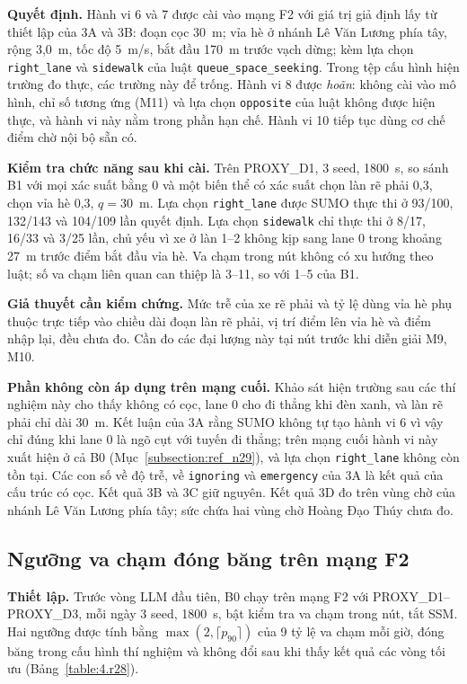 \documentclass[../DoAn.tex]{subfiles}
\begin{document}
\textbf{Quyết định.} Hành vi 6 và 7 được cài vào mạng F2 với giá trị giả định lấy từ thiết lập của 3A và 3B: đoạn cọc 30~m; vỉa hè ở nhánh Lê Văn Lương phía tây, rộng 3,0~m, tốc độ 5~m/s, bắt đầu 170~m trước vạch dừng; kèm lựa chọn \texttt{right\_lane} và \texttt{sidewalk} của luật \texttt{queue\_space\_seeking}. Trong tệp cấu hình hiện trường đo thực, các trường này để trống. Hành vi 8 được \emph{hoãn}: không cài vào mô hình, chỉ số tương ứng (M11) và lựa chọn \texttt{opposite} của luật không được hiện thực, và hành vi này nằm trong phần hạn chế. Hành vi 10 tiếp tục dùng cơ chế điểm chờ nội bộ sẵn có.

\textbf{Kiểm tra chức năng sau khi cài.} Trên PROXY\_D1, 3 seed, 1800~s, so sánh B1 với mọi xác suất bằng 0 và một biến thể có xác suất chọn làn rẽ phải 0,3, chọn vỉa hè 0,3, $q = 30$~m. Lựa chọn \texttt{right\_lane} được SUMO thực thi ở 93/100, 132/143 và 104/109 lần quyết định. Lựa chọn \texttt{sidewalk} chỉ thực thi ở 8/17, 16/33 và 3/25 lần, chủ yếu vì xe ở làn 1--2 không kịp sang lane 0 trong khoảng 27~m trước điểm bắt đầu vỉa hè. Va chạm trong nút không có xu hướng theo luật; số va chạm liên quan can thiệp là 3--11, so với 1--5 của B1.

\textbf{Giả thuyết cần kiểm chứng.} Mức trễ của xe rẽ phải và tỷ lệ dùng vỉa hè phụ thuộc trực tiếp vào chiều dài đoạn làn rẽ phải, vị trí điểm lên vỉa hè và điểm nhập lại, đều chưa đo. Cần đo các đại lượng này tại nút trước khi diễn giải M9, M10.

\textbf{Phần không còn áp dụng trên mạng cuối.} Khảo sát hiện trường sau các thí nghiệm này cho thấy không có cọc, lane 0 cho đi thẳng khi đèn xanh, và làn rẽ phải chỉ dài 30~m. Kết luận của 3A rằng SUMO không tự tạo hành vi 6 vì vậy chỉ đúng khi lane 0 là ngõ cụt với tuyến đi thẳng; trên mạng cuối hành vi này xuất hiện ở cả B0 (Mục~\ref{subsection:ref_n29}), và lựa chọn \texttt{right\_lane} không còn tồn tại. Các con số về độ trễ, về \texttt{ignoring} và \texttt{emergency} của 3A là kết quả của cấu trúc có cọc. Kết quả 3B và 3C giữ nguyên. Kết quả 3D đo trên vùng chờ của nhánh Lê Văn Lương phía tây; sức chứa hai vùng chờ Hoàng Đạo Thúy chưa đo.

\subsection{Ngưỡng va chạm đóng băng trên mạng F2}
\label{subsection:r28_f2}

\textbf{Thiết lập.} Trước vòng LLM đầu tiên, B0 chạy trên mạng F2 với PROXY\_D1--PROXY\_D3, mỗi ngày 3 seed, 1800~s, bật kiểm tra va chạm trong nút, tắt SSM. Hai ngưỡng được tính bằng $\max(2, \lceil p_{90} \rceil)$ của 9 tỷ lệ va chạm mỗi giờ, đóng băng trong cấu hình thí nghiệm và không đổi sau khi thấy kết quả các vòng tối ưu (Bảng~\ref{table:4.r28}).
\end{document}
